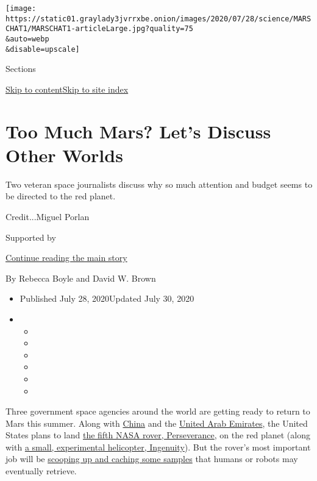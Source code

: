 \texttt{[image: https://static01.graylady3jvrrxbe.onion/images/2020/07/28/science/MARSCHAT1/MARSCHAT1-articleLarge.jpg?quality=75\\\&auto=webp\\\&disable=upscale]}

Sections

\protect\hyperlink{site-content}{Skip to
content}\protect\hyperlink{site-index}{Skip to site index}

\hypertarget{too-much-mars-lets-discuss-other-worlds}{%
\section{Too Much Mars? Let's Discuss Other
Worlds}\label{too-much-mars-lets-discuss-other-worlds}}

Two veteran space journalists discuss why so much attention and budget
seems to be directed to the red planet.

Credit...Miguel Porlan

Supported by

\protect\hyperlink{after-sponsor}{Continue reading the main story}

By Rebecca Boyle and David W. Brown

\begin{itemize}
\item
  Published July 28, 2020Updated July 30, 2020
\item
  \begin{itemize}
  \item
  \item
  \item
  \item
  \item
  \item
  \end{itemize}
\end{itemize}

Three government space agencies around the world are getting ready to
return to Mars this summer. Along with
\href{https://www.nytimes3xbfgragh.onion/2020/07/22/science/china-mars-mission.html}{China}
and the
\href{https://www.nytimes3xbfgragh.onion/2020/07/14/science/mars-united-arab-emirates.html}{United
Arab Emirates}, the United States plans to land
\href{https://www.nytimes3xbfgragh.onion/interactive/2020/science/mars-perseverance-tianwen-hope.html}{the
fifth NASA rover, Perseverance}, on the red planet (along with
\href{https://www.nytimes3xbfgragh.onion/2020/06/23/science/mars-helicopter-nasa.html}{a
small, experimental helicopter, Ingenuity}). But the rover's most
important job will be
\href{https://www.nytimes3xbfgragh.onion/2020/07/28/science/mars-sample-return-mission.html}{scooping
up and caching some samples} that humans or robots may eventually
retrieve.

